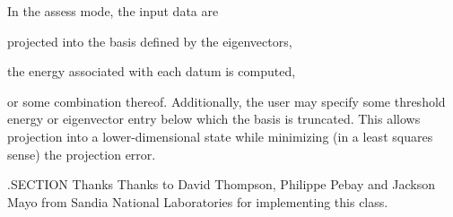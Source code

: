 In the assess mode, the input data are
\begin{DoxyItemize}
\item projected into the basis defined by the eigenvectors,
\item the energy associated with each datum is computed,
\item or some combination thereof. Additionally, the user may specify some threshold energy or eigenvector entry below which the basis is truncated. This allows projection into a lower-\/dimensional state while minimizing (in a least squares sense) the projection error.
\end{DoxyItemize}

.S\-E\-C\-T\-I\-O\-N Thanks Thanks to David Thompson, Philippe Pebay and Jackson Mayo from Sandia National Laboratories for implementing this class.

